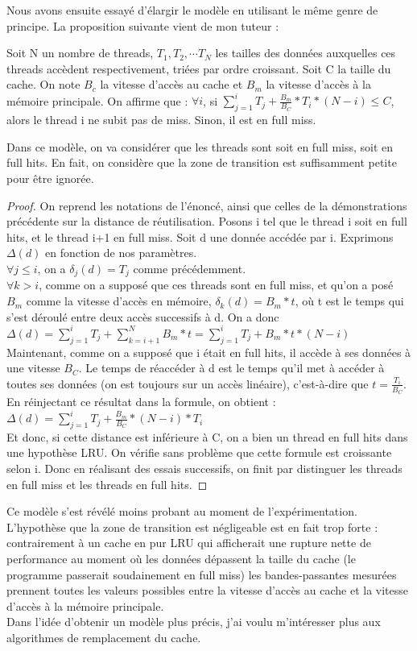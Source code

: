 \documentclass{report}
\begin{document}
Nous avons ensuite essayé d'élargir le modèle en utilisant le même genre de principe. La
proposition suivante vient de mon tuteur :
\begin{th2}
Soit N un nombre de threads, $T_1, T_2, \cdots T_N$ les tailles des données auxquelles ces threads
accèdent respectivement, triées par ordre croissant. Soit C la taille du cache. On note $B_c$ la 
vitesse d'accès au cache et $B_m$ la vitesse d'accès à la mémoire principale. On affirme que :
$\forall i$, si $\sum_{j=1}^{i}{T_{j}} + \frac{B_m}{B_C} * T_i * (N - i) \leq C$, alors le
thread i ne subit pas de miss. Sinon, il est en full miss.
\end{th2}

Dans ce modèle, on va considérer que les threads sont soit en full miss, soit en full hits.
En fait, on considère que la zone de transition est suffisamment petite pour être ignorée.
\begin{proof}
  On reprend les notations de l'énoncé, ainsi que celles de la démonstrations précédente sur
  la distance de réutilisation.
  Posons i tel que le thread i soit en full hits, et le thread i+1 en full miss. Soit d une 
  donnée accédée par i. Exprimons $\Delta(d)$ en fonction de nos paramètres.
\\  $\forall j \leq i$, on a $\delta_j(d) = T_j$ comme précédemment.
 \\ $\forall k > i$, comme on a supposé que ces threads sont en full miss, et qu'on a posé
 $B_m$ comme la vitesse d'accès en mémoire, $\delta_k(d)=B_m * t$, où t est le temps qui 
 s'est déroulé entre deux accès successifs à d.
 On a donc $\Delta(d)= \sum_{j=1}^{i}{T_j} + \sum_{k=i+1}^{N}{B_m * t} = \sum_{j=1}^{i}{T_j}
 + B_m * t * (N - i)$
 \\Maintenant, comme on a supposé que i était en full hits, il accède à ses données à une
 vitesse $B_C$. Le temps de réaccéder à d est le temps qu'il met à accéder à toutes ses
 données (on est toujours sur un accès linéaire), c'est-à-dire que $t= \frac{T_i}{B_C}$.
 En réinjectant ce résultat dans la formule, on obtient :
 \\ $\Delta(d)=  \sum_{j=1}^{i}{T_j} + \frac{B_m}{B_C} * (N - i) * T_i $
 \\Et donc, si cette distance est inférieure à C, on a bien un thread en full hits dans
 une hypothèse LRU. On vérifie sans problème que cette formule est croissante selon i. 
 Donc en réalisant des essais successifs, on finit par distinguer les threads en full
 miss et les threads en full hits. 
\end{proof}
Ce modèle s'est révélé moins probant au moment de l'expérimentation. L'hypothèse 
que la zone de transition est négligeable est en fait trop forte : contrairement à
un cache en pur LRU qui afficherait une rupture nette de performance au moment où
les données dépassent la taille du cache (le programme passerait soudainement en 
full miss) les bandes-passantes mesurées prennent toutes les valeurs possibles entre la 
vitesse d'accès au cache et la vitesse d'accès à la mémoire principale. 
\\Dans l'idée d'obtenir un modèle plus précis, j'ai voulu m'intéresser plus aux algorithmes
de remplacement du cache.
\end{document}
